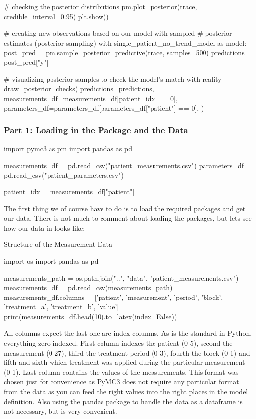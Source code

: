 \documentclass[12pt,a4paper,leqno]{report}
\theoremstyle{plain}
\theoremstyle{definition}
\theoremstyle{remark}
\begin{document}
\begin{pyverbatim}[][fontsize=\footnotesize]
    # checking the posterior distributions
    pm.plot_posterior(trace, credible_interval=0.95)
    plt.show()

 
# creating new observations based on our model with sampled
# posterior estimates (posterior sampling)
with single_patient_no_trend_model as model:
    post_pred = pm.sample_posterior_predictive(trace, samples=500)
    predictions = post_pred["y"]

# visualizing posterior samples to check the model's match with reality
draw_posterior_checks(
    predictions=predictions,
    measurements_df=measurements_df[patient_idx == 0],
    parameters_df=parameters_df[parameters_df["patient"] == 0],
)
\end{pyverbatim}
\smallskip

\subsubsection*{Part 1: Loading in the Package and the Data}

\bigskip
\begin{pyverbatim}[][fontsize=\footnotesize]
import pymc3 as pm
import pandas as pd

measurements_df = pd.read_csv("patient_measurements.csv")
parameters_df = pd.read_csv("patient_parameters.csv")

patient_idx = measurements_df["patient"]
\end{pyverbatim}
\smallskip

The first thing we of course have to do is to load the required packages and get our data. There is
not much to comment about loading the packages, but lets see how our data in
 looks like:

\bigskip
\begin{table}[H]
\caption{Structure of the Measurement Data}\label{measurements}
\bigskip
\centering
\begin{pycode}
import os
import pandas as pd

measurements_path = os.path.join("..", "data", "patient_measurements.csv")
measurements_df = pd.read_csv(measurements_path)
measurements_df.columns = ['patient', 'measurement', 'period', 'block',
'treatment_a', 'treatment_b', 'value']
print(measurements_df.head(10).to_latex(index=False))
\end{pycode}
\end{table}
\bigskip

All columns expect the last one are index columns. As is the standard in Python, everything
zero-indexed. First column indexes the patient (0-5), second the
measurement (0-27), third the treatment period (0-3), fourth the block (0-1) and fifth
and sixth which treatment was applied during the particular measurement (0-1). Last
column contains the values of the measurements. This format was chosen just for
convenience as PyMC3 does not require any particular format from the
data as you can feed the right values into
the right places in the model definition. Also using the pandas package to handle the
data as a dataframe is not necessary, but is very convenient.
\end{document}
